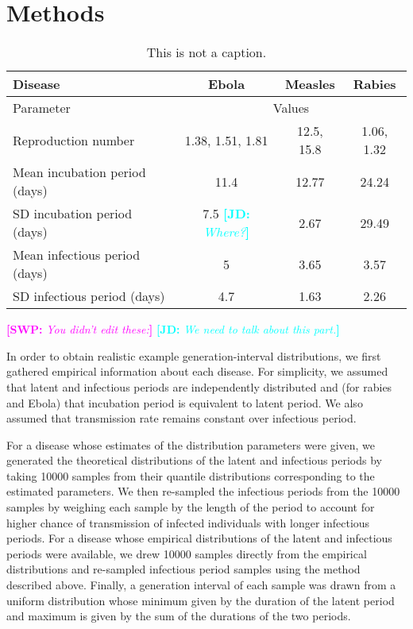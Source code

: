 \documentclass[12pt,]{article}
\newcommand{\tlab}[1]{\label{tab:#1}}
\newcommand{\comment}[3]{\textcolor{#1}{\textbf{[#2: }\textit{#3}\textbf{]}}}
\newcommand{\jd}[1]{\comment{cyan}{JD}{#1}}
\newcommand{\swp}[1]{\comment{magenta}{SWP}{#1}}
\begin{document}
\section{Methods}

\begin{table}[h!]
\centering
\begin{tabular}{l*{3}{c}}
\hline
Disease & Ebola & Measles & Rabies\\
\hline
Parameter & \multicolumn{3}{c}{Values}\\
\hline
Reproduction number & 1.38, 1.51, 1.81 \cite{WHO14} & 12.5, 15.8 \cite{AndeMay82} & 1.06, 1.32 \cite{HampDush09} \\
Mean incubation period (days) & 11.4 \cite{WHO14} & 12.77 \cite{LessReic09inc}  & 24.24 \cite{HampDush09} \\
SD incubation period (days) & 7.5 \jd{Where?} & 2.67 \cite{LessReic09inc} & 29.49 \cite{HampDush09} \\
Mean infectious period (days) & 5 \cite{WHO14} & 3.65 \cite{Lloy01} & 3.57 \cite{HampDush09} \\
SD infectious period (days) & 4.7 \cite{WHO14} & 1.63 \cite{Lloy01} & 2.26 \cite{HampDush09}
\end{tabular}
\caption{This is not a caption.}
\tlab{parameters}
\end{table}

\swp{You didn't edit these:}
\jd{We need to talk about this part.}

In order to obtain realistic example generation-interval distributions, we first gathered empirical information about each disease. For simplicity, we assumed that latent and infectious periods are independently distributed and (for rabies and Ebola) that incubation period is equivalent to latent period. We also assumed that transmission rate remains constant over infectious period.

For a disease whose estimates of the distribution parameters were given, we generated the theoretical distributions of the latent and infectious periods by taking 10000 samples from their quantile distributions corresponding to the estimated parameters. We then re-sampled the infectious periods from the 10000 samples by weighing each sample by the length of the period to account for higher chance of transmission of infected individuals with longer infectious periods. 
For a disease whose empirical distributions of the latent and infectious periods were available, we drew 10000 samples directly from the empirical distributions and re-sampled infectious period samples using the method described above.
Finally, a generation interval of each sample was drawn from a uniform distribution whose minimum given by the duration of the latent period and maximum is given by the sum of the durations of the two periods.
\end{document}
